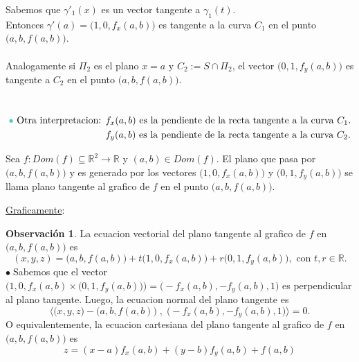 \documentclass{article}
\theoremstyle{definition}
\newtheorem*{obs}{Observación}
\theoremstyle{remark}
\newcommand\bl{$\bullet\;$}
\begin{document}
Sabemos que $\gamma'_1(x)$ es un vector tangente a $\gamma_1(t)$. \\ Entonces $\gamma'(a)=\big(1,0,f_x(a,b)\big)$ es tangente a la curva $C_1$ en el punto $\big(a,b,f(a,b)\big)$.\\\\
Analogamente si $\Pi_2$ es el plano $x=a$\; y\; $C_2:= S \cap \Pi_2$, el vector $\big(0,1,f_y(a,b)\big)$ es tangente a $C_2$ en el punto $\big(a,b,f(a,b)\big)$.
\begin{figure}[h]
\centering
\def\svgwidth{0.75\textwidth}

\end{figure} \\
 \begin{align*}
  \textcolor{verdep2}{\bullet}\text{ Otra interpretacion: } & f_x(a,b) \text{ es la pendiente de la recta tangente a la curva }C_1.\\
                              & f_y(a,b) \text{ es la pendiente de la recta tangente a la curva }C_2. \end{align*}
                              \pagebreak
\begin{defi}
  Sea $f : Dom(f) \subseteq \mathbb{R}^2 \to \mathbb{R}$ y $(a,b) \in Dom(f)$. El plano que pasa por $\big(a,b,f(a,b)\big)$ y es generado por los vectores $\big(1,0,f_x(a,b)\big)$ y $\big(0,1,f_y(a,b)\big)$ se llama plano tangente al grafico de $f$ en el punto $\big(a,b,f(a,b)\big)$.
\end{defi}
\underline{Graficamente}:
\begin{figure}[h]
\centering
\def\svgwidth{0.35\textwidth}

\end{figure} 
\begin{obs}
  La ecuacion vectorial del plano tangente al grafico de $f$ en $\big(a,b,f(a,b)\big)$ es \[
    (x,y,z) = \big(a,b,f(a,b)\big)+t\big(1,0,f_x(a,b)\big)+r\big(0,1,f_y(a,b)\big), \text{ con } t, r \in \mathbb{R}.
  \]
  \bl Sabemos que el vector $\big(1,0,f_x(a,b) \times \big(0,1,f_y(a,b)\big)\big)= \big(-f_x(a,b),-f_y(a,b),1\big)$ es perpendicular al plano tangente. Luego, la ecuacion normal del plano tangente es \[
    \big\langle\big(x,y,z\big)-\big(a,b,f(a,b)\big) \; , \; \big(-f_x(a,b),-f_y(a,b),1\big)\big\rangle =0.
    \] O equivalentemente, la ecuacion cartesiana del plano tangente al grafico de $f$ en $\big(a,b,f(a,b)\big)$ es\[
    z=(x-a)f_x(a,b)+(y-b)f_y(a,b)+f(a,b)
  \]
\end{obs}\pagebreak
\end{document}
